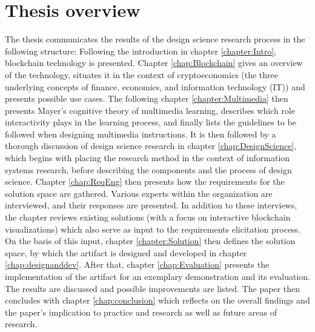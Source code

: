 \section{Thesis overview} \label{sec:ThesisOverview}
The thesis communicates the results of the design science research process in the following structure: Following the introduction in chapter \ref{chapter:Intro}, blockchain technology is presented. Chapter \ref{chap:Blockchain} gives an overview of the technology, situates it in the context of cryptoeconomics (the three underlying concepts of finance, economics, and information technology (\acs{IT})) and presents possible use cases. The following chapter \ref{chapter:Multimedia} then presents Mayer's cognitive theory of multimedia learning, describes which role interactivity plays in the learning process, and finally lists the guidelines to be followed when designing multimedia instructions. It is then followed by a thorough discussion of design science research in chapter \ref{chap:DesignScience}, which begins with placing the research method in the context of information systems research, before describing the components and the process of design science. Chapter \ref{chap:ReqEng} then presents how the requirements for the solution space are gathered. Various experts within the organization are interviewed, and their responses are presented. In addition to these interviews, the chapter reviews existing solutions (with a focus on interactive blockchain visualizations) which also serve as input to the requirements elicitation process. On the basis of this input, chapter \ref{chapter:Solution} then defines the solution space, by which the artifact is designed and developed in chapter \ref{chap:designanddev}. After that, chapter \ref{chap:Evaluation} presents the implementation of the artifact for an exemplary demonstration and its evaluation. The results are discussed and possible improvements are listed. The paper then concludes with chapter \ref{chap:conclusion} which reflects on the overall findings and the paper's implication to practice and research as well as future areas of research.

